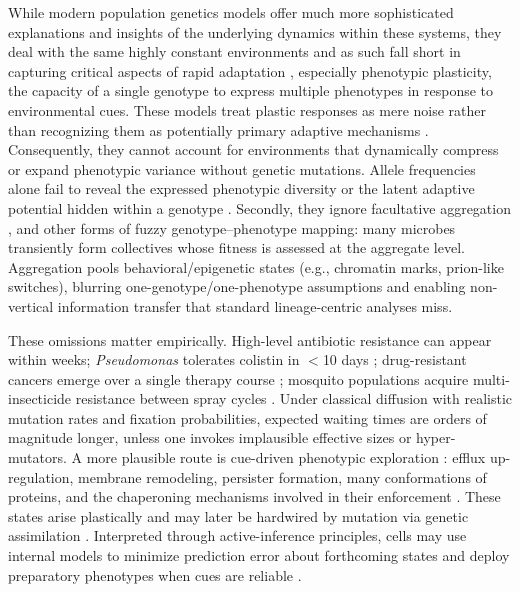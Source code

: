 \documentclass[aps,pre,twocolumn,floatfix,nofootinbib,amsmath,amssymb]{revtex4-2}
\begin{document}
While modern population genetics models offer much more sophisticated explanations and insights \citep{desai_beneficial_2007,good_dynamics_2017,levy_quantitative_2015} of the underlying dynamics within these systems, they deal with the same highly constant environments and as such fall short in capturing critical aspects of rapid adaptation \citep{zheng_cryptic_2019,paaby_cryptic_2014,forsman_rethinking_2015}, especially phenotypic plasticity, the capacity of a single genotype to express multiple phenotypes in response to environmental cues. These models treat plastic responses as mere noise rather than recognizing them as potentially primary adaptive mechanisms \citep{forsman_rethinking_2015,lyon_reframing_2021}. Consequently, they cannot account for environments that dynamically compress or expand phenotypic variance without genetic mutations. Allele frequencies alone fail to reveal the expressed phenotypic diversity or the latent adaptive potential hidden within a genotype \citep{zheng_cryptic_2019,paaby_cryptic_2014,ayroles_behavioral_2015}. Secondly, they ignore facultative aggregation \citep{sebe-pedros_regulated_2013,ros-rocher_chemical_2023,schwartzman_bacterial_2022}, and other forms of fuzzy genotype–phenotype mapping: many microbes transiently form collectives whose fitness is assessed at the aggregate level. Aggregation pools behavioral/epigenetic states (e.g., chromatin marks, prion-like switches), blurring one-genotype/one-phenotype assumptions and enabling non-vertical information transfer that standard lineage-centric analyses miss.

These omissions matter empirically. High-level antibiotic resistance can appear within weeks; \textit{Pseudomonas} tolerates colistin in $<$10 days \citep{alarcon_rios_colistin_2025}; drug-resistant cancers emerge over a single therapy course \citep{dagogo-jack_tumour_2018,franca_cellular_2024}; mosquito populations acquire multi-insecticide resistance between spray cycles \citep{oruni_temporal_2024}. Under classical diffusion with realistic mutation rates and fixation probabilities, expected waiting times are orders of magnitude longer, unless one invokes implausible effective sizes or hyper-mutators. A more plausible route is cue-driven phenotypic exploration \citep{acar_stochastic_2008}: efflux up-regulation, membrane remodeling, persister formation, many conformations of proteins, and the chaperoning mechanisms involved in their enforcement \citep{blake_noise_2003}. These states arise plastically and may later be hardwired by mutation via genetic assimilation \citep{waddington_genetic_1953,crispo_baldwin_2007}. Interpreted through active-inference principles, cells may use internal models to minimize prediction error about forthcoming states and deploy preparatory phenotypes when cues are reliable \citep{lyon_reframing_2021}.
\end{document}
